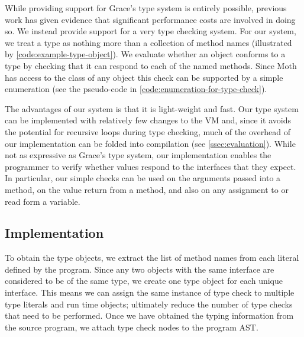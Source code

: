 While providing support for Grace's type system is entirely possible,
previous work has given evidence that significant performance costs are involved in doing so.
We instead provide support for a very  type checking system.
For our system,
we treat a type as nothing more than a collection of method names
(illustrated by \cref{code:example-type-object}).
We evaluate whether an object conforms to a type
by checking that it can respond to each of the named methods.
Since Moth has access to the class of any object this check 
can be supported by a simple enumeration
(see the pseudo-code in \cref{code:enumeration-for-type-check}).

The advantages of our system is that it is light-weight and fast. 
Our type system can be implemented with relatively few changes to the VM and,
since it avoids the potential for recursive loops during type checking,
much of the overhead of our implementation can be folded into compilation (see \cref{ssec:evaluation}).
While not as expressive as Grace's type system, our implementation enables
the programmer to verify whether values respond to the interfaces that they expect. 
In particular,
our simple checks can be used on the arguments passed into a method,
on the value return from a method, and also
on any assignment to or read form a variable.



\subsection{Implementation}


To obtain the type objects,
we extract the list of method names from each literal defined by the program.
Since any two objects with the same interface are considered to be of the same type,
we create one type object for each unique interface. 
This means we can assign the same instance of type check to multiple type literals
and run time objects;
ultimately reduce the number of type checks that need to be performed.
Once we have obtained the typing information from the source program,
we attach type check nodes to the program AST.

